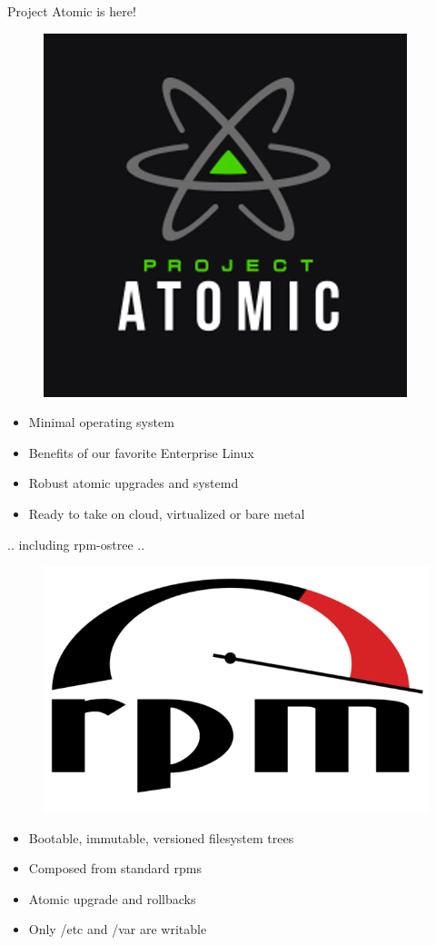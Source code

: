 \documentclass{beamer}
\begin{document}
\begin{frame}{Project Atomic is here!}
\begin{figure}[htp]
\centering
\includegraphics[scale=0.25]{atomic_logo.png}
\label{}
\end{figure}
\begin{itemize}
  \item Minimal operating system
  \item Benefits of our favorite Enterprise Linux
  \item Robust atomic upgrades and systemd 
  \item Ready to take on cloud, virtualized or bare metal
\end{itemize}
\end{frame}

\begin{frame}{.. including rpm-ostree ..}
\begin{figure}[htp]
\centering
\includegraphics[scale=0.70]{Rpm_logo.png}
\label{}
\end{figure}
\begin{itemize}
  \item Bootable, immutable, versioned filesystem trees
  \item Composed from standard rpms
  \item Atomic upgrade and rollbacks
  \item Only /etc and /var are writable
\end{itemize}
\end{frame}
\end{document}
